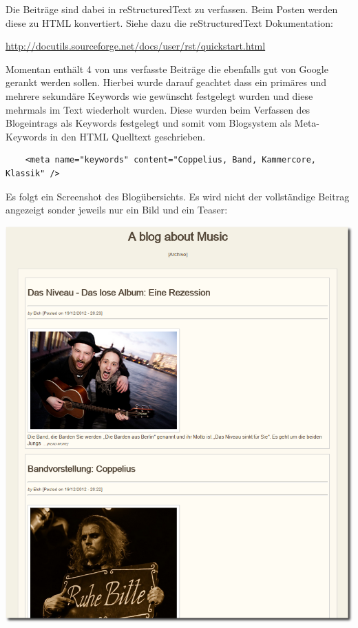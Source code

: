 Die Beiträge sind dabei in reStructuredText zu verfassen. Beim Posten werden
diese zu HTML konvertiert. Siehe dazu die reStructuredText Dokumentation:

\begin{center}
\url{http://docutils.sourceforge.net/docs/user/rst/quickstart.html}
\end{center}

Momentan enthält 4 von uns verfasste Beiträge die ebenfalls gut von Google
gerankt werden sollen. Hierbei wurde darauf geachtet dass ein primäres und
mehrere sekundäre Keywords wie gewünscht festgelegt wurden und diese mehrmals im
Text wiederholt wurden. Diese wurden beim Verfassen des Blogeintrags als
Keywords festgelegt und somit vom Blogsystem als Meta-Keywords in den HTML
Quelltext geschrieben.

\begin{verbatim}
    <meta name="keywords" content="Coppelius, Band, Kammercore, Klassik" />
\end{verbatim}

Es folgt ein Screenshot des Blogübersichts. Es wird nicht der vollständige
Beitrag angezeigt sonder jeweils nur ein Bild und ein Teaser:

\begin{center}
\includegraphics[width=\textwidth]{../screenshots/blog_overview1.png}
\end{center}


